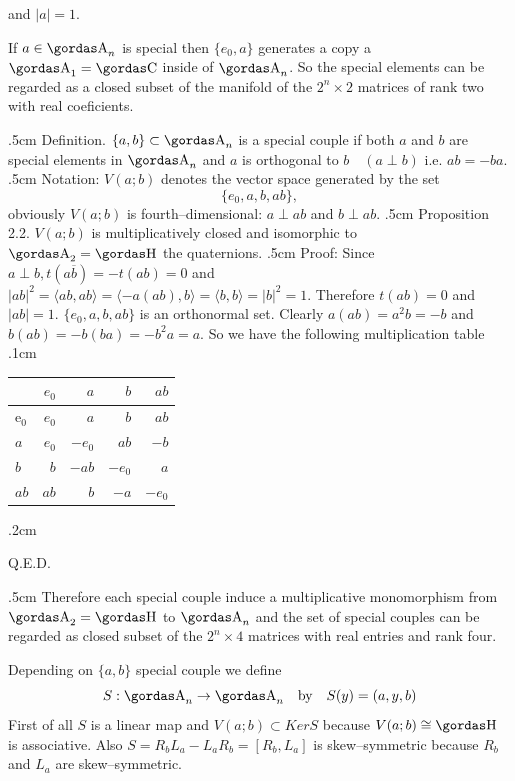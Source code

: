 and $|a|=1$.
\par 
If $a\in \a_{n}$ is special then $\{e_{0},a\}$ generates a copy a $\a_{1}=\ce$ inside
of $\a_{n}$. So the special elements can be regarded as a closed subset of the 
manifold of the $2^{n}\times 2 $ matrices of rank two with real coeficients.
\par 
\vglue.5cm
\noindent
{\bsbf Definition.} $\{a,b\}\subset \a_{n}$ is a special couple if both $a$ and
$b$ are special elements in $\a_{n}$ and $a$ is orthogonal to $b\quad (a\perp b)$
i.e. $ab=-ba$.
\vglue.5cm
\noindent
{\bsbf Notation:} $V(a;b)$ denotes the vector space generated by the set
$$\{e_{0},a,b,ab\},$$
obviously $V(a;b)$ is fourth--dimensional: $a\perp ab$ and $b\perp ab$.
\vglue.5cm
\noindent
{\bsbf Proposition 2.2.} $V(a;b)$ 
is multiplicatively closed and isomorphic to\\
$\a_{2}=\ache$ the quaternions.
\vglue.5cm
\noindent
{\bsbf Proof:} Since $a\perp b, t(a\overline{b})=-t(ab)=0$ and
$|ab|^{2}=\langle ab,ab\rangle=\langle -a(ab),b\rangle=\langle b,b\rangle=
|b|^{2}=1$. 
Therefore $t(ab)=0$ and $|ab|=1$. $\{e_{0},a,b,ab\}$ is an orthonormal set.
Clearly $a(ab)=a^{2}b=-b$ and $b(ab)=-b(ba)=-b^{2}a=a$. So we have the following 
multiplication table
\vglue.1cm
\begin{center}
\begin{tabular}{l|rrrr}
&$e_{0}$&$a$&$b$&$ab$\\ \hline
e$_{0}$&$e_{0}$&$a$&$b$&$ab$\\
$a$&$e_{0}$&$-e_{0}$&$ab$&$-b$\\              
$b$&$b$&$-ab$&$-e_{0}$&$a$\\
$ab$&$ab$&$b$&$-a$&$-e_{0}$
\end{tabular}
\end{center}
\vglue.2cm
\begin{flushright}
Q.E.D.
\end{flushright}
\vglue.5cm
Therefore each special couple induce a multiplicative monomorphism from
$\a_{2}=\ache$ to $\a_{n}$ and the set of special couples can be regarded as 
closed subset of the $2^{n}\times 4$ matrices with real entries and rank four.
\par 
Depending on $\{a,b\}$ special couple we define
$$S:\a_{n}\rightarrow \a_{n}\quad\hbox{\bs by}\quad S(y)=(a,y,b)$$
First of all $S$ is a linear map and $V(a;b)\subset Ker S$ because
$V(a;b)\cong\ache$ is associative. Also $S=R_{b}L_{a}-L_{a}R_{b}=[R_{b},L_{a}]$ is
skew--symmetric because $R_{b}$ and $L_{a}$ are skew--symmetric.
\par 
